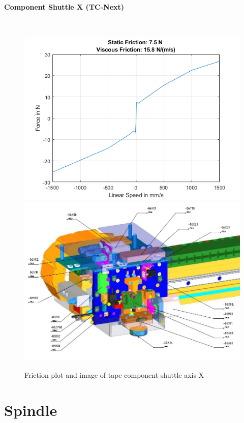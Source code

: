 			\paragraph{Component Shuttle X (TC-Next)}\leavevmode\\
				\begin{figure}[h!]
					\centering
					\includegraphics[width=0.49\linewidth]{./pics/friction_componentShuttleX.png}
					\includegraphics[width=0.45\linewidth]{./pics/componentshuttleX.jpg}
					\caption{Friction plot and image of tape component shuttle axis X}
				\end{figure}
				\clearpage
		
	\section{Spindle}
